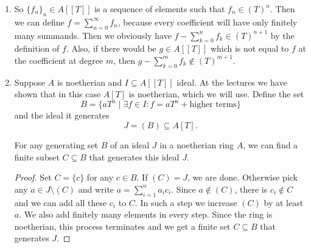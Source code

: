 \newcommand{\sheet}{3}




\maketitle

\begin{exercise}{1}
    \begin{enumerate}
        \item So ${\{f_n\}}_n \in A[[T]]$ is a sequence of elements such that $f_n
            \in {(T)}^n$. Then we can define $f = \sum^{\infty}_{n = 0} f_n$,
            because every coefficient will have only finitely many summands.
            Then we obviously have $f - \sum^{n}_{k = 0} f_k \in {(T)}^{n+1}$ by
            the definition of $f$. Also, if there would be $g \in A[[T]]$ which
            is not equal to $f$ at the coefficient at degree $m$, then $g -
            \sum^{m}_{k = 0} f_k \notin {(T)}^{m+1}$.
        \item Suppose $A$ is noetherian and $I \subseteq A[[T]]$ ideal. At the
            lectures we have shown that in this case $A[T]$ is noetherian, which
            we will use.
            Define the set
            \begin{equation*}
                B = \{ a T^n \mid \exists f \in I \colon f = a T^n +
                \text{higher terms} \}
            \end{equation*}
            and the ideal it generates
            \begin{equation*}
                J = (B) \subseteq A[T].
            \end{equation*}

            \begin{claim}
                For any generating set $B$ of an ideal $J$ in a noetherian ring
                $A$, we can find a finite subset $C \subseteq B$ that generates
                this ideal $J$.
            \end{claim}

            \begin{proof}
                Set $C = \{c\}$ for any $c \in B$. If $(C) = J$, we are done.
                Otherwise pick any $a \in J \setminus (C)$ and write $a =
                \sum^{n}_{i=1} a_i c_i$. Since $a \notin (C)$, there is $c_i
                \notin C$ and we can add all these $c_i$ to $C$. In such a step
                we increase $(C)$ by at least $a$. We also add finitely many
                elements in every step. Since the ring is noetherian, this
                process terminates and we get a finite set $C \subseteq B$ that
                generates $J$.
            \end{proof}


\end{enumerate}
\end{exercise}
